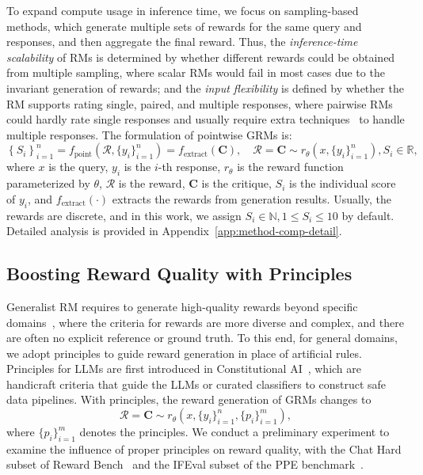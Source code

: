 \documentclass{article} %
\begin{document}
To expand compute usage in inference time, we focus on sampling-based methods, which generate multiple sets of rewards for the same query and responses, and then aggregate the final reward. Thus, the \textit{inference-time scalability} of RMs is determined by whether different rewards could be obtained from multiple sampling, where scalar RMs would fail in most cases due to the invariant generation of rewards; and the \textit{input flexibility} is defined by whether the RM supports rating single, paired, and multiple responses, where pairwise RMs could hardly rate single responses and usually require extra techniques~\citep{jiang-etal-2023-llm,liu2025pairjudgermperformbestofn} to handle multiple responses. 
The formulation of pointwise GRMs is: 
\begin{equation}
  \left\{ S_i \right\}_{i=1}^n = f_{\mathrm{point}}\left(\mathcal{R}, \{y_i\}_{i=1}^n\right) = f_{\mathrm{extract}}(\boldsymbol{C}), \quad \mathcal{R} = \boldsymbol{C} \sim r_{\theta}\left(x, \{y_i\}_{i=1}^n\right), S_i \in \mathbb{R},
\end{equation}
where $x$ is the query, $y_i$ is the $i$-th response, $r_{\theta}$ is the reward function parameterized by $\theta$, $\mathcal{R}$ is the reward, $\boldsymbol{C}$ is the critique, $S_i$ is the individual score of $y_i$, and $f_{\mathrm{extract}}(\cdot)$ extracts the rewards from generation results. Usually, the rewards are discrete, and in this work, we assign $S_i \in \mathbb{N}, 1 \leq S_i \leq 10$ by default. Detailed analysis is provided in Appendix~\ref{app:method-comp-detail}.

\vspace{-0.5em}
\subsection{Boosting Reward Quality with Principles}
\label{sec:principle-understand}

Generalist RM requires to generate high-quality rewards beyond specific domains~\citep{hendrycks2021measuring,jimenez2024swebench}, where the criteria for rewards are more diverse and complex, and there are often no explicit reference or ground truth. To this end, for general domains, we adopt principles to guide reward generation in place of artificial rules. 
Principles for LLMs are first introduced in Constitutional AI~\citep{bai2022constitutionalaiharmlessnessai,sharma2025constitutionalclassifiersdefendinguniversal}, which are handicraft criteria that guide the LLMs or curated classifiers to construct safe data pipelines. With principles, the reward generation of GRMs changes to 
\begin{equation}\label{eq:principle-understand}
  \mathcal{R} = \boldsymbol{C} \sim r_{\theta}\left(x, \{y_i\}_{i=1}^n, \{p_i\}_{i=1}^m\right),
\end{equation}
where $\{p_i\}_{i=1}^m$ denotes the principles.
We conduct a preliminary experiment to examine the influence of proper principles on reward quality, with the Chat Hard subset of Reward Bench~\citep{lambert2024rewardbenchevaluatingrewardmodels} and the IFEval subset of the PPE benchmark~\citep{frick2025how}. 
\end{document}
